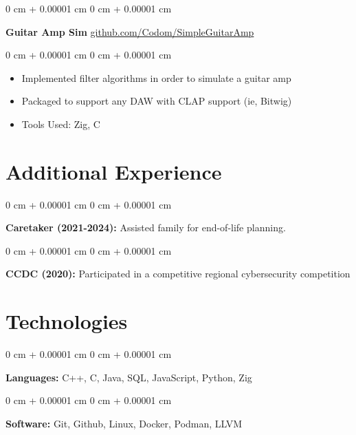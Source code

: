 \documentclass[10pt, letterpaper]{article}
\newenvironment{highlights}{
    \begin{itemize}[
        topsep=0.10 cm,
        parsep=0.10 cm,
        partopsep=0pt,
        itemsep=0pt,
        leftmargin=0 cm + 10pt
    ]
}{
    \end{itemize}
} %
\newenvironment{onecolentry}{
    \begin{adjustwidth}{
        0 cm + 0.00001 cm
    }{
        0 cm + 0.00001 cm
    }
}{
    \end{adjustwidth}
} %
\newenvironment{twocolentry}[2][]{
    \onecolentry
    \def\secondColumn{#2}
    \setcolumnwidth{\fill, 6.0 cm}
    \begin{paracol}{2}
}{
    \switchcolumn \raggedleft \secondColumn
    \end{paracol}
    \endonecolentry
} %
\begin{document}
        \vspace{0.2 cm}

        \begin{twocolentry}{
            \href{https://github.com/Codom/SimpleGuitarAmp}{github.com/Codom/SimpleGuitarAmp}
        }
            \textbf{Guitar Amp Sim}\end{twocolentry}

        \vspace{0.10 cm}
        \begin{onecolentry}
            \begin{highlights}
                \item Implemented filter algorithms in order to simulate a guitar amp
                \item Packaged to support any DAW with CLAP support (ie, Bitwig)
                \item Tools Used: Zig, C
            \end{highlights}
        \end{onecolentry}

    \section{Additional Experience}

        \begin{onecolentry}
            \textbf{Caretaker (2021-2024):} Assisted family for end-of-life planning.
        \end{onecolentry}

        \vspace{0.2 cm}

        \begin{onecolentry}
            \textbf{CCDC (2020):} Participated in a competitive regional cybersecurity competition
        \end{onecolentry}

    \section{Technologies}
        \begin{onecolentry}
            \textbf{Languages:} C++, C, Java, SQL, JavaScript, Python, Zig
        \end{onecolentry}

        \vspace{0.2 cm}

        \begin{onecolentry}
            \textbf{Software:} Git, Github, Linux, Docker, Podman, LLVM
        \end{onecolentry}
\end{document}
